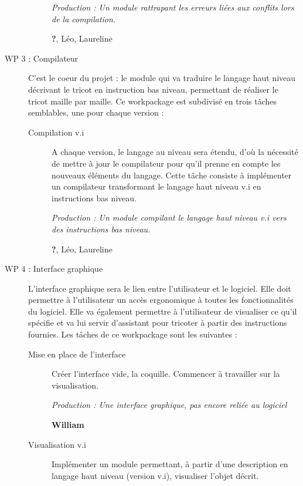 \documentclass{article}
\begin{document}
\begin{description}
\begin{description}
      \textit{Production : Un module rattrapant les erreurs liées aux conflits lors de la compilation.}

      \textbf{?}, Léo, Laureline

    \end{description}

\medskip

\item[WP 3 : Compilateur] C'est le coeur du projet : le module qui va traduire le langage haut niveau décrivant le tricot en instruction bas niveau, permettant de réaliser le tricot maille par maille. Ce workpackage est subdivisé en trois tâches semblables, une pour chaque version :

    \begin{description}
    \item[Compilation v.i] A chaque version, le langage au niveau sera étendu, d'où la nécessité de mettre à jour le compilateur pour qu'il prenne en compte les nouveaux éléments du langage. Cette tâche consiste à implémenter un compilateur transformant le langage haut niveau v.i en instructions bas niveau.

      \textit{Production : Un module compilant le langage haut niveau v.i vers des instructions bas niveau.}

      \textbf{?}, Léo, Laureline %
    \end{description}

\medskip

\item[WP 4 : Interface graphique] L'interface graphique sera le lien entre l'utilisateur et le logiciel. Elle doit permettre à l'utilisateur un accès ergonomique à toutes les fonctionnalités du logiciel. Elle va également permettre à l'utilisateur de visualiser ce qu'il spécifie et va lui servir d'assistant pour tricoter à partir des instructions fournies. Les tâches de ce workpackage sont les suivantes :

  \begin{description}
  \item[Mise en place de l'interface] Créer l'interface vide, la coquille. Commencer à travailler sur la visualisation.

    \textit{Production : Une interface graphique, pas encore reliée au logiciel}

    \textbf{William}

  \item[Visualisation v.i] Implémenter un module permettant, à partir d'une description en langage haut niveau (version v.i), visualiser l'objet décrit.


\end{description}
\end{description}
\end{document}
